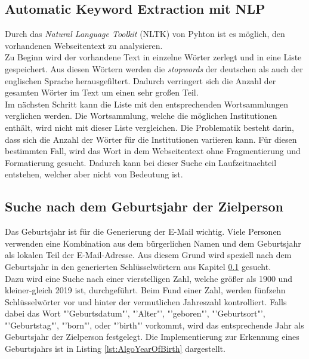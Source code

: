 	
	\subsection{Automatic Keyword Extraction mit NLP}
	\label{subsec:AutomaticKeywordExtractionNLP}
	Durch das \textit{Natural Language Toolkit} (NLTK) von Pyhton ist es möglich, den vorhandenen Webseitentext zu analysieren.\\
	Zu Beginn wird der vorhandene Text in einzelne Wörter zerlegt und in eine Liste gespeichert. Aus diesen Wörtern werden die \textit{stopwords} der deutschen als auch der englischen Sprache herausgefiltert. Dadurch verringert sich die Anzahl der gesamten Wörter im Text um einen sehr großen Teil. \\
	Im nächsten Schritt kann die Liste mit den entsprechenden Wortsammlungen verglichen werden. Die Wortsammlung, welche die möglichen Institutionen enthält, wird nicht mit dieser Liste vergleichen. Die Problematik besteht darin, dass sich die Anzahl der Wörter für die Institutionen variieren kann. Für diesen bestimmten Fall, wird das Wort in dem Webseitentext ohne Fragmentierung und Formatierung gesucht. Dadurch kann bei dieser Suche ein Laufzeitnachteil entstehen, welcher aber nicht von Bedeutung ist. 

	\subsection{Suche nach dem Geburtsjahr der Zielperson}
	Das Geburtsjahr ist für die Generierung der E-Mail wichtig. Viele Personen verwenden eine Kombination aus dem bürgerlichen Namen und dem Geburtsjahr als lokalen Teil der E-Mail-Adresse. Aus diesem Grund wird speziell nach dem Geburtsjahr in den generierten Schlüsselwörtern aus Kapitel \ref{subsec:AutomaticKeywordExtractionNLP} gesucht.\\
	Dazu wird eine Suche nach einer vierstelligen Zahl, welche größer als 1900 und kleiner-gleich 2019 ist, durchgeführt. Beim Fund einer Zahl, werden  fünfzehn Schlüsselwörter vor und hinter der vermutlichen Jahreszahl kontrolliert. Falls dabei das Wort "'Geburtsdatum"', "'Alter"', "'geboren"', "'Geburtsort"', "'Geburtstag"', "'born"', oder "'birth"' vorkommt, wird das entsprechende Jahr als Geburtsjahr der Zielperson festgelegt. Die Implementierung zur Erkennung eines Geburtsjahrs ist in Listing \ref{lst:AlgoYearOfBirth} dargestellt.\\
	
